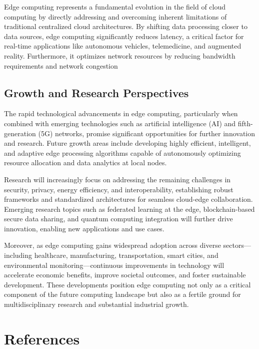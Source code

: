 \documentclass[runningheads]{llncs}
\begin{document}
Edge computing represents a fundamental evolution in the field of cloud computing by directly addressing and overcoming inherent limitations of traditional centralized cloud architectures. By shifting data processing closer to data sources, edge computing significantly reduces latency, a critical factor for real-time applications like autonomous vehicles, telemedicine, and augmented reality. Furthermore, it optimizes network resources by reducing bandwidth requirements and network congestion


\subsection{Growth and Research Perspectives}

The rapid technological advancements in edge computing, particularly when combined with emerging technologies such as artificial intelligence (AI) and fifth-generation (5G) networks, promise significant opportunities for further innovation and research. Future growth areas include developing highly efficient, intelligent, and adaptive edge processing algorithms capable of autonomously optimizing resource allocation and data analytics at local nodes.

Research will increasingly focus on addressing the remaining challenges in security, privacy, energy efficiency, and interoperability, establishing robust frameworks and standardized architectures for seamless cloud-edge collaboration. Emerging research topics such as federated learning at the edge, blockchain-based secure data sharing, and quantum computing integration will further drive innovation, enabling new applications and use cases.

Moreover, as edge computing gains widespread adoption across diverse sectors—
including healthcare, manufacturing, transportation, smart cities, and environmental monitoring—continuous improvements in technology will accelerate economic benefits, improve societal outcomes, and foster sustainable development. These developments position edge computing not only as a critical component of the future computing landscape but also as a fertile ground for multidisciplinary research and substantial industrial growth.

\section{References}
\nocite{*} %
\end{document}
